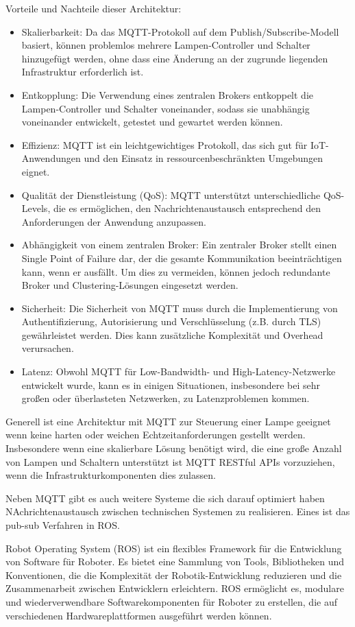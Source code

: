 Vorteile und Nachteile dieser Architektur: 
\begin{itemize}
\item Skalierbarkeit: Da das MQTT-Protokoll auf dem Publish/Subscribe-Modell basiert, können problemlos mehrere Lampen-Controller und Schalter hinzugefügt werden, ohne dass eine Änderung an der zugrunde liegenden Infrastruktur erforderlich ist.
\item Entkopplung: Die Verwendung eines zentralen Brokers entkoppelt die Lampen-Controller und Schalter voneinander, sodass sie unabhängig voneinander entwickelt, getestet und gewartet werden können.
\item Effizienz: MQTT ist ein leichtgewichtiges Protokoll, das sich gut für IoT-Anwendungen und den Einsatz in ressourcenbeschränkten Umgebungen eignet.
\item Qualität der Dienstleistung (QoS): MQTT unterstützt unterschiedliche QoS-Levels, die es ermöglichen, den Nachrichtenaustausch entsprechend den Anforderungen der Anwendung anzupassen.
\item Abhängigkeit von einem zentralen Broker: Ein zentraler Broker stellt einen Single Point of Failure dar, der die gesamte Kommunikation beeinträchtigen kann, wenn er ausfällt. Um dies zu vermeiden, können jedoch redundante Broker und Clustering-Lösungen eingesetzt werden.
\item Sicherheit: Die Sicherheit von MQTT muss durch die Implementierung von Authentifizierung, Autorisierung und Verschlüsselung (z.B. durch TLS) gewährleistet werden. Dies kann zusätzliche Komplexität und Overhead verursachen.
\item Latenz: Obwohl MQTT für Low-Bandwidth- und High-Latency-Netzwerke entwickelt wurde, kann es in einigen Situationen, insbesondere bei sehr großen oder überlasteten Netzwerken, zu Latenzproblemen kommen.
\end{itemize}

Generell ist eine Architektur mit MQTT zur Steuerung einer Lampe geeignet wenn keine harten oder weichen Echtzeitanforderungen gestellt werden. Insbesondere wenn eine skalierbare Lösung benötigt wird, die eine große Anzahl von Lampen und Schaltern unterstützt ist MQTT RESTful APIs vorzuziehen, wenn die Infrastrukturkomponenten dies zulassen. 

Neben MQTT gibt es auch weitere Systeme die sich darauf optimiert haben NAchrichtenaustausch zwischen technischen Systemen zu realisieren. Eines ist das pub-sub Verfahren in ROS. 

Robot Operating System (ROS) ist ein flexibles Framework für die Entwicklung von Software für Roboter. Es bietet eine Sammlung von Tools, Bibliotheken und Konventionen, die die Komplexität der Robotik-Entwicklung reduzieren und die Zusammenarbeit zwischen Entwicklern erleichtern. ROS ermöglicht es, modulare und wiederverwendbare Softwarekomponenten für Roboter zu erstellen, die auf verschiedenen Hardwareplattformen ausgeführt werden können.

